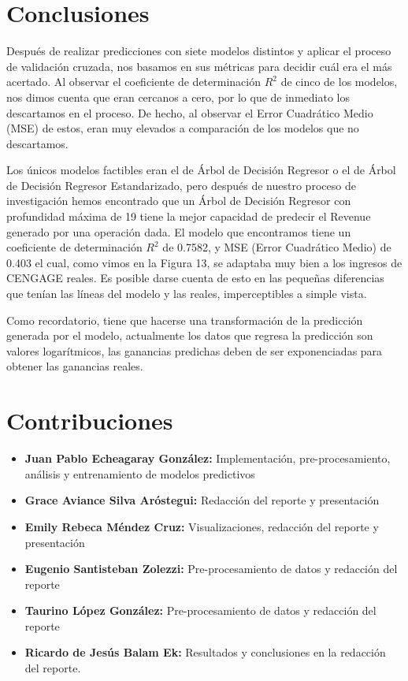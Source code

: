 \documentclass{article}
\begin{document}
    \section{Conclusiones}
        Después de realizar predicciones con siete modelos distintos y aplicar el proceso de validación cruzada, nos basamos en sus métricas para decidir cuál era el más acertado. Al observar el coeficiente de determinación $R^{2}$ de cinco de los modelos, nos dimos cuenta que eran cercanos a cero, por lo que de inmediato los descartamos en el proceso. De hecho, al observar el Error Cuadrático Medio (MSE) de estos, eran muy elevados a comparación de los modelos que no descartamos.
        
        Los únicos modelos factibles eran el de Árbol de Decisión Regresor o el de Árbol de Decisión Regresor Estandarizado, pero después de nuestro proceso de investigación hemos encontrado que un Árbol de Decisión Regresor con profundidad máxima de 19 tiene la mejor capacidad de predecir el Revenue generado por una operación dada. El modelo que encontramos tiene un coeficiente de determinación $R^{2}$ de 0.7582, y MSE (Error Cuadrático Medio) de 0.403 el cual, como vimos en la Figura 13, se adaptaba muy bien a los ingresos de CENGAGE reales. Es posible darse cuenta de esto en las pequeñas diferencias que tenían las líneas del modelo y las reales, imperceptibles a simple vista.
        
        Como recordatorio, tiene que hacerse una transformación de la predicción generada por el modelo, actualmente los datos que regresa la predicción son valores logarítmicos, las ganancias predichas deben de ser exponenciadas para obtener las ganancias reales.

    \section{Contribuciones}
        \begin{itemize}
            \item \textbf{Juan Pablo Echeagaray González:} Implementación, pre-procesamiento, análisis y entrenamiento de modelos predictivos
            \item \textbf{Grace Aviance Silva Aróstegui:} Redacción del reporte y presentación
            \item \textbf{Emily Rebeca Méndez Cruz:} Visualizaciones, redacción del reporte y presentación
            \item \textbf{Eugenio Santisteban Zolezzi:} Pre-procesamiento de datos y redacción del reporte
            \item \textbf{Taurino López González:} Pre-procesamiento de datos y redacción del reporte
            \item \textbf{Ricardo de Jesús Balam Ek:} Resultados y  conclusiones en la redacción del reporte.
        \end{itemize}

    \clearpage
    \nocite{*}
    \printbibliography
\end{document}
